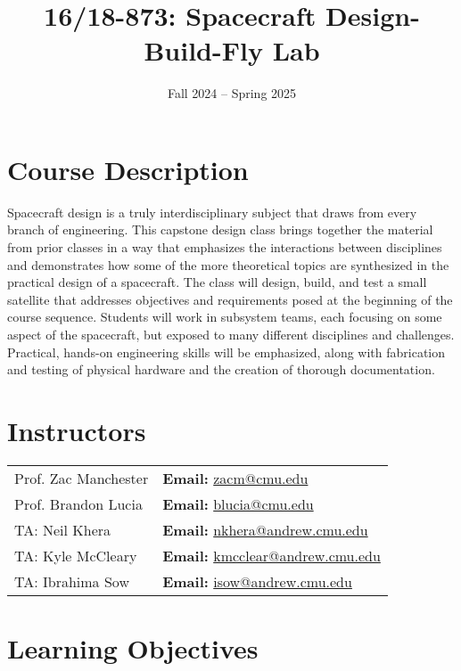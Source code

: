 \documentclass[11pt,letterpaper]{article}
\title{16/18-873: Spacecraft Design-Build-Fly Lab}
\author{Fall 2024 -- Spring 2025}
\date{}
\begin{document}
\maketitle

\section*{Course Description}

Spacecraft design is a truly interdisciplinary subject that draws from every branch of engineering. This capstone design class brings together the material from prior classes in a way that emphasizes the interactions between disciplines and demonstrates how some of the more theoretical topics are synthesized in the practical design of a spacecraft. The class will design, build, and test a small satellite that addresses objectives and requirements posed at the beginning of the course sequence. Students will work in subsystem teams, each focusing on some aspect of the spacecraft, but exposed to many different disciplines and challenges. Practical, hands-on engineering skills will be emphasized, along with fabrication and testing of physical hardware and the creation of thorough documentation.

\section*{Instructors}

\begin{center}
\begin{tabular}{l l}
	Prof. Zac Manchester & \textbf{Email:} \href{mailto:zacm@cmu.edu}{zacm@cmu.edu} \\
	Prof. Brandon Lucia & \textbf{Email:} \href{mailto:blucia@cmu.edu}{blucia@cmu.edu}
	\\
	TA: Neil Khera & \textbf{Email:} \href{nkhera@andrew.cmu.edu}{nkhera@andrew.cmu.edu}
	\\
	TA: Kyle McCleary & \textbf{Email:} \href{kmcclear@andrew.cmu.edu}{kmcclear@andrew.cmu.edu}
	\\
	TA: Ibrahima Sow & \textbf{Email:} \href{isow@andrew.cmu.edu}{isow@andrew.cmu.edu}
\end{tabular}
\end{center}

\section*{Learning Objectives}
\end{document}
